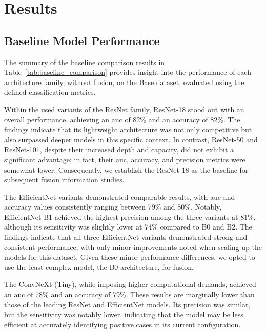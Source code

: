 \chapter{Results}

\section{Baseline Model Performance}

The summary of the baseline comparison results in Table~\ref{tab:baseline_comparison} provides insight into the performance of each architecture family, without fusion, on the Base dataset, evaluated using the defined classification metrics.

Within the used variants of the ResNet family, ResNet-18 stood out with an overall performance, achieving an \ac{auc} of 82\% and an accuracy of 82\%. 
The findings indicate that its lightweight architecture was not only competitive but also surpassed deeper models in this specific context. In contrast, ResNet-50 and ResNet-101, despite their increased depth and capacity, did not exhibit a significant advantage; in fact, their \ac{auc}, accuracy, and precision metrics were somewhat lower.
Consequently, we establish the ResNet-18 as the baseline for subsequent fusion information studies.

The EfficientNet variants demonstrated comparable results, with \ac{auc} and accuracy values consistently ranging between 79\% and 80\%. Notably, EfficientNet-B1 achieved the highest precision among the three variants at 81\%, although its sensitivity was slightly lower at 74\% compared to B0 and B2.
The findings indicate that all three EfficientNet variants demonstrated strong and consistent performance, with only minor improvements noted when scaling up the models for this dataset. Given these minor performance differences, we opted to use the least complex model, the B0 architecture, for fusion.

The ConvNeXt (Tiny), while imposing higher computational demands, achieved an \ac{auc} of 78\% and an accuracy of 79\%. These results are marginally lower than those of the leading ResNet and EfficientNet models. Its precision was similar, but the sensitivity was notably lower, indicating that the model may be less efficient at accurately identifying positive cases in its current configuration.

